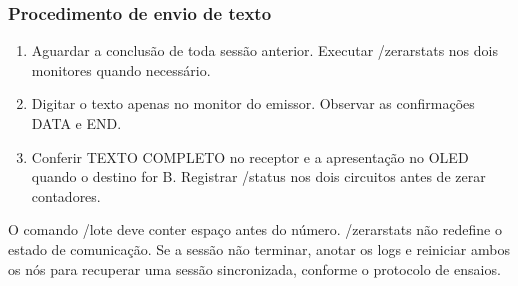 \subsubsection*{Procedimento de envio de texto}
\begin{enumerate}
\item Aguardar a conclusão de toda sessão anterior. Executar /zerarstats nos dois monitores quando necessário.
\item Digitar o texto apenas no monitor do emissor. Observar as confirmações DATA e END.
\item Conferir TEXTO COMPLETO no receptor e a apresentação no OLED quando o destino for B. Registrar /status nos dois circuitos antes de zerar contadores.
\end{enumerate}
O comando /lote deve conter espaço antes do número. /zerarstats não redefine o estado de comunicação. Se a sessão não terminar, anotar os logs e reiniciar ambos os nós para recuperar uma sessão sincronizada, conforme o protocolo de ensaios.

